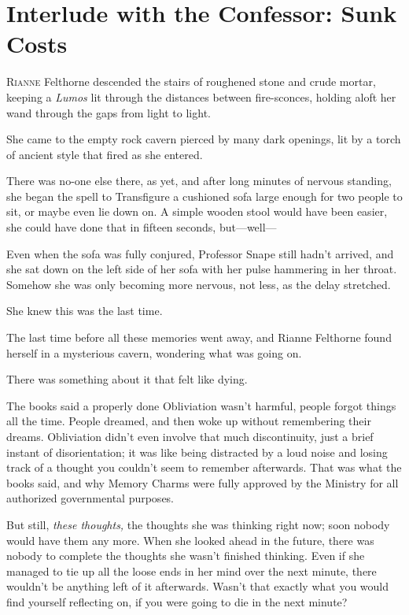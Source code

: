 \chapter{Interlude with the Confessor: Sunk Costs}

\lettrine{R}{ianne} Felthorne descended the stairs of roughened stone and crude mortar, keeping a \emph{Lumos} lit through the distances between fire-sconces, holding aloft her wand through the gaps from light to light.

She came to the empty rock cavern pierced by many dark openings, lit by a torch of ancient style that fired as she entered.

There was no-one else there, as yet, and after long minutes of nervous standing, she began the spell to Transfigure a cushioned sofa large enough for two people to sit, or maybe even lie down on. A simple wooden stool would have been easier, she could have done that in fifteen seconds, but—well—

Even when the sofa was fully conjured, Professor Snape still hadn’t arrived, and she sat down on the left side of her sofa with her pulse hammering in her throat. Somehow she was only becoming more nervous, not less, as the delay stretched.

She knew this was the last time.

The last time before all these memories went away, and Rianne Felthorne found herself in a mysterious cavern, wondering what was going on.

There was something about it that felt like dying.

The books said a properly done Obliviation wasn’t harmful, people forgot things all the time. People dreamed, and then woke up without remembering their dreams. Obliviation didn’t even involve that much discontinuity, just a brief instant of disorientation; it was like being distracted by a loud noise and losing track of a thought you couldn’t seem to remember afterwards. That was what the books said, and why Memory Charms were fully approved by the Ministry for all authorized governmental purposes.

But still, \emph{these thoughts,} the thoughts she was thinking right now; soon nobody would have them any more. When she looked ahead in the future, there was nobody to complete the thoughts she wasn’t finished thinking. Even if she managed to tie up all the loose ends in her mind over the next minute, there wouldn’t be anything left of it afterwards. Wasn’t that exactly what you would find yourself reflecting on, if you were going to die in the next minute?

